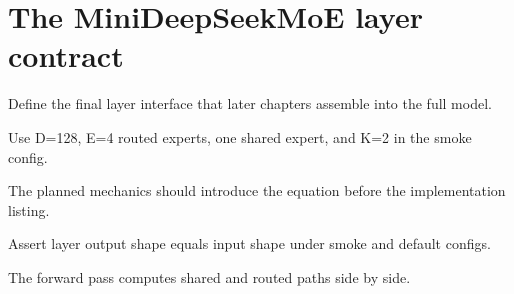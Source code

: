 \section{The MiniDeepSeekMoE layer contract}
\label{sec:ch08-the-minideepseekmoe-layer-contract}

Define the final layer interface that later chapters assemble into the full model.



Use D=128, E=4 routed experts, one shared expert, and K=2 in the smoke config.



The planned mechanics should introduce the equation before the implementation listing.





\begin{checkpointbox}
Assert layer output shape equals input shape under smoke and default configs.
\end{checkpointbox}

The forward pass computes shared and routed paths side by side.
